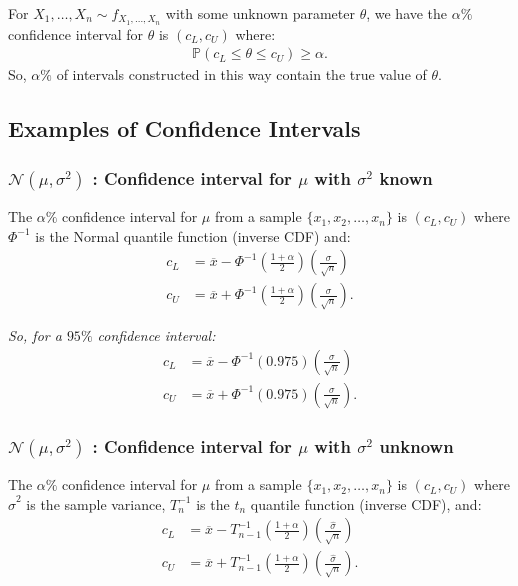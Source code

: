 \documentclass[a4paper, 12pt, twoside]{article}
\begin{document}
For $X_1, \ldots, X_n \sim f_{X_1, \ldots, X_n}$ with some unknown
parameter $\theta$, we have the $\alpha\%$ confidence interval
for $\theta$ is $(c_L, c_U)$ where:
\begin{align*}
    \mathbb{P}(c_L \leq \theta \leq c_U) \geq \alpha.
\end{align*}
So, $\alpha\%$ of intervals constructed in this way contain the
true value of $\theta$.

\subsection{Examples of Confidence Intervals}

\subsubsection{$\mathcal{N}(\mu, \sigma^2)$ : Confidence
    interval for $\mu$ with $\sigma^2$ known}

The $\alpha\%$ confidence interval for $\mu$ from a sample
$\{x_1, x_2, \ldots, x_n\}$ is $(c_L, c_U)$ where $\Phi^{-1}$ is the
Normal quantile function (inverse CDF) and:
\begin{align*}
    c_L & = \overline{x} - \Phi^{-1}\left(\frac{1 + \alpha}{2}\right)
    \left(\frac{\sigma}{\sqrt{n}}\right)                              \\
    c_U & = \overline{x} + \Phi^{-1}\left(\frac{1 + \alpha}{2}\right)
    \left(\frac{\sigma}{\sqrt{n}}\right).
\end{align*}

\textit{So, for a $95\%$ confidence interval:}
\begin{align*}
    c_L & = \overline{x} - \Phi^{-1}\left(0.975\right)
    \left(\frac{\sigma}{\sqrt{n}}\right)               \\
    c_U & = \overline{x} + \Phi^{-1}\left(0.975\right)
    \left(\frac{\sigma}{\sqrt{n}}\right).
\end{align*}

\subsubsection{$\mathcal{N}(\mu, \sigma^2)$ : Confidence
    interval for $\mu$ with $\sigma^2$ unknown}

The $\alpha\%$ confidence interval for $\mu$ from a sample
$\{x_1, x_2, \ldots, x_n\}$ is $(c_L, c_U)$ where $\hat\sigma^2$ is
the sample variance, $T^{-1}_{n}$ is the $t_{n}$ quantile function
(inverse CDF), and:
\begin{align*}
    c_L & = \overline{x} - T^{-1}_{n-1}\left(\frac{1 + \alpha}{2}\right)
    \left(\frac{\hat\sigma}{\sqrt{n}}\right)                             \\
    c_U & = \overline{x} + T^{-1}_{n-1}\left(\frac{1 + \alpha}{2}\right)
    \left(\frac{\hat\sigma}{\sqrt{n}}\right).
\end{align*}
\end{document}
